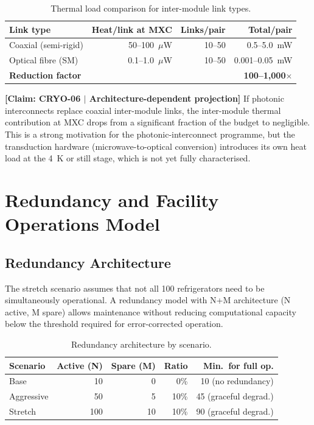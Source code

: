 \documentclass[conference]{IEEEtran}
\begin{document}
\begin{table}[H]
\centering
\caption{Thermal load comparison for inter-module link types.}
\label{tab:link-thermal}
\footnotesize
\begin{tabularx}{\columnwidth}{L{2.5cm}rrr}
\toprule
\textbf{Link type} & \textbf{Heat/link at MXC} & \textbf{Links/pair} & \textbf{Total/pair} \\
\midrule
Coaxial (semi-rigid) & 50--100~$\mu$W & 10--50 & 0.5--5.0~mW \\
Optical fibre (SM) & 0.1--1.0~$\mu$W & 10--50 & 0.001--0.05~mW \\
\textbf{Reduction factor} & & & \textbf{100--1,000$\times$} \\
\bottomrule
\end{tabularx}
\end{table}

\textbf{[Claim: CRYO-06 $|$ Architecture-dependent projection]} If photonic interconnects replace coaxial inter-module links, the inter-module thermal contribution at MXC drops from a significant fraction of the budget to negligible. This is a strong motivation for the photonic-interconnect programme, but the transduction hardware (microwave-to-optical conversion) introduces its own heat load at the 4~K or still stage, which is not yet fully characterised.

\section{Redundancy and Facility Operations Model}

\subsection{Redundancy Architecture}

The stretch scenario assumes that not all 100 refrigerators need to be simultaneously operational. A redundancy model with N+M architecture (N active, M spare) allows maintenance without reducing computational capacity below the threshold required for error-corrected operation.

\begin{table}[H]
\centering
\caption{Redundancy architecture by scenario.}
\label{tab:redundancy}
\footnotesize
\begin{tabularx}{\columnwidth}{lrrrr}
\toprule
\textbf{Scenario} & \textbf{Active (N)} & \textbf{Spare (M)} & \textbf{Ratio} & \textbf{Min.\ for full op.} \\
\midrule
Base & 10 & 0 & 0\% & 10 (no redundancy) \\
Aggressive & 50 & 5 & 10\% & 45 (graceful degrad.) \\
Stretch & 100 & 10 & 10\% & 90 (graceful degrad.) \\
\bottomrule
\end{tabularx}
\end{table}
\end{document}
